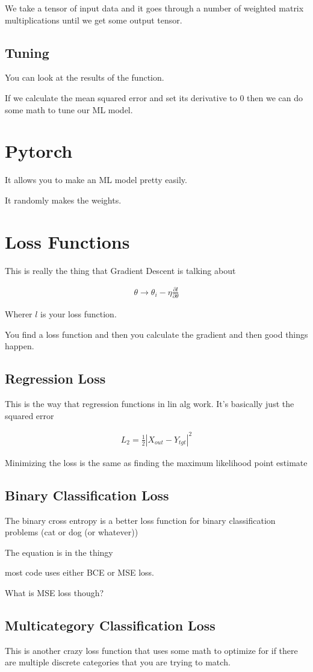 \documentclass[fleqn]{report}
\newcommand{\del}{\partial}
\newcommand{\equations} [1] {
\begin{gather*}
#1
\end{gather*}
}
\begin{document}
We take a tensor of input data and it goes through a number of weighted matrix 
multiplications until we get some output tensor. 

\subsection{Tuning}
You can look at the results of the function.

If we calculate the mean squared error and set its derivative to 0 
then we can do some math to tune our ML model.

\section{Pytorch}
It allows you to make an ML model pretty easily. 

It randomly makes the weights.

\section{Loss Functions}
This is really the thing that Gradient Descent is talking about 
\equations{
    \theta \rightarrow 
    \theta_i - \eta \frac{\del l}{\del \theta}
}
Wherer $l$ is your loss function. 

You find a loss function and then you calculate the gradient 
and then good things happen. 

\subsection{Regression Loss}
This is the way that regression functions in lin alg work. 
It's basically just the squared error 
\equations{
    L_2 
    =   
    \frac{1}{2}
    |X_{out} - Y_{tgt}|^2
}

Minimizing the loss is the same as finding the maximum likelihood 
point estimate 

\subsection{Binary Classification Loss}
The binary cross entropy is a better loss function for binary 
classification problems (cat or dog (or whatever))

The equation is in the thingy

most code uses either BCE or MSE loss.

What is MSE loss though?

\subsection{Multicategory Classification Loss}
This is another crazy loss function that uses some math 
to optimize for if there are multiple discrete categories that you 
are trying to match. 
\end{document}

